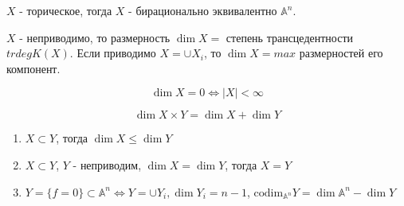 \documentclass{article}
\begin{document}
\begin{definition}
    $X$ - торическое, тогда $X$ - бирационально эквивалентно $\mathbb{A}^n$.
\end{definition}

\begin{definition}
    $X$ - неприводимо, то размерность $\dim X =$ степень трансцедентности $trdeg K(X)$.
    Если приводимо $X = \cup X_i$, то $\dim X = max$ размерностей его компонент.
\end{definition}

\begin{theorem}
    $$\dim X = 0 \Longleftrightarrow |X| < \infty$$
\end{theorem}

\begin{theorem}
    $$\dim X \times Y = \dim X + \dim Y$$
\end{theorem}

\begin{theorem}
    \begin{enumerate}
        \item     $X \subset Y$, тогда $\dim X \leq \dim Y$
        \item $X \subset Y$, $Y$ - неприводим, $\dim X = \dim Y$, тогда $X = Y$
         \item $Y = \{f = 0\} \subset \mathbb{A}^n \Longleftrightarrow Y = \cup Y_i, \dim Y_i = n - 1$, $\text{codim}_{\mathbb{A}^n} Y = \dim \mathbb{A}^n - \dim Y$
    \end{enumerate}
\end{theorem}
\end{document}
